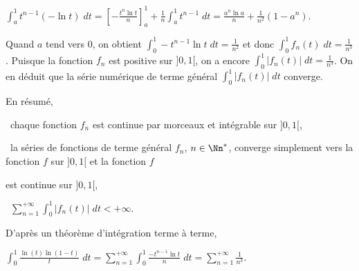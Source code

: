 {\begin{enumerate}
{\begin{center}
$\int_{a}^{1}t^{n-1}(-\ln t)\;dt=\left[-\frac{t^n\ln t}{n}\right]_a^1+\frac{1}{n}\int_{a}^{1}t^{n-1}\;dt=\frac{a^n\ln a}{n}+\frac{1}{n^2}(1-a^n)$.
\end{center}

Quand $a$ tend vers $0$, on obtient $\int_{0}^{1}-t^{n-1}\ln t\;dt=\frac{1}{n^2}$ et donc $\int_{0}^{1}f_n(t)\;dt=\frac{1}{n^3}$. Puisque la fonction $f_n$ est positive sur $]0,1[$, on a encore $\int_{0}^{1}|f_n(t)|\;dt=\frac{1}{n^3}$. On en déduit que la série numérique de terme général $\int_{0}^{1}|f_n(t)|\;dt$ converge.

En résumé,

\textbullet~chaque fonction $f_n$ est continue par morceaux et intégrable sur $]0,1[$,

\textbullet~la séries de fonctions de terme général $f_n$, $n\in\Nn^*$, converge simplement vers la fonction $f$ sur $]0,1[$ et la fonction $f$

est continue sur $]0,1[$,

\textbullet~$\sum_{n=1}^{+\infty}\int_{0}^{1}|f_n(t)|\;dt<+\infty$.

D'après un théorème d'intégration terme à terme,

\begin{center}
$\int_{0}^{1}\frac{\ln(t)\ln(1-t)}{t}\;dt=\sum_{n=1}^{+\infty}\int_{0}^{1}\frac{-t^{n-1}\ln t}{n}\;dt=\sum_{n=1}^{+\infty}\frac{1}{n^3}$.
\end{center}

\begin{center}
\end{center}}
\end{enumerate}
}
